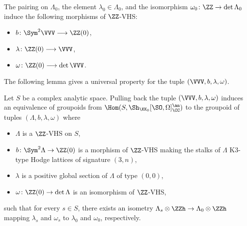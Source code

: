 The pairing on $\Lambda_0$, the element $\lambda_0 \in \Lambda_0$, and the isomorphism $\omega_0\colon \ZZ \rightarrow \det \Lambda_0$ induce the following morphisms of $\ZZ$-VHS:
\begin{itemize}
    \item $b\colon \Sym^2 \VVV \longrightarrow \ZZ(0)$,
    \item $\lambda\colon \ZZ(0) \longrightarrow \VVV$,
    \item $\omega\colon \ZZ(0) \longrightarrow \det \VVV$.
\end{itemize}
The following lemma gives a universal property for the tuple $(\VVV,b,\lambda,\omega)$.

\begin{lemma}\label{lem:moduli_vhs}
    Let $S$ be a complex analytic space. Pulling back the tuple $(\VVV,b,\lambda,\omega)$ induces an equivalence of groupoids from $\Hom(S,\Sh_{\KK_0}[\SO,\Omega]_{\CC}^{\an})$ to the groupoid of tuples $(\Lambda,b,\lambda,\omega)$ where
\begin{itemize}
\item $\Lambda$ is a $\ZZ$-VHS on $S$,
\item $b\colon \Sym^2 \Lambda \rightarrow \ZZ(0)$ is a morphism of $\ZZ$-VHS making the stalks of $\Lambda$ K3-type Hodge lattices of signature $(3,n)$,
\item $\lambda$ is a positive global section of $\Lambda$ of type $(0,0)$,
\item $\omega\colon \ZZ(0) \rightarrow \det \Lambda$ is an isomorphism of $\ZZ$-VHS,
\end{itemize}
such that for every $s \in S$, there exists an isometry $\Lambda_s \otimes \ZZh \rightarrow \Lambda_0 \otimes \ZZh$ mapping $\lambda_{s}$ and $\omega_{s}$ to $\lambda_0$ and $\omega_0$, respectively.
\end{lemma}
